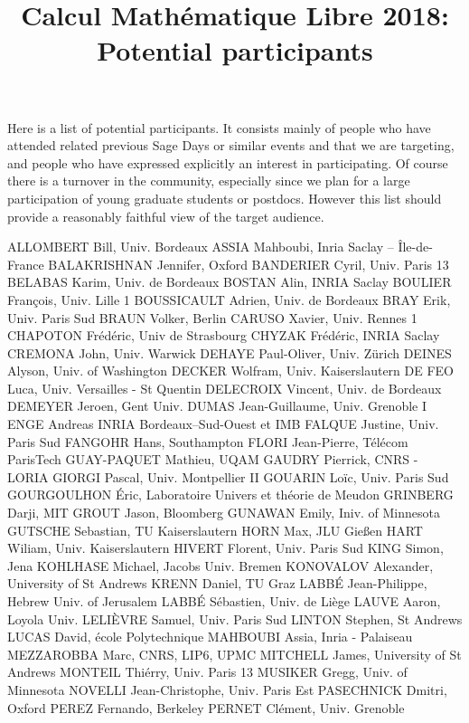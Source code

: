 \documentclass[12pt]{amsart}
\title{Calcul Mathématique Libre 2018:\\Potential participants}
\date{}
\begin{document}
\maketitle
\thispagestyle{empty}

Here is a list of potential participants. It consists mainly of people
who have attended related previous Sage Days or similar events and
that we are targeting, and people who have expressed explicitly an
interest in participating. Of course there is a turnover in the
community, especially since we plan for a large participation of young
graduate students or postdocs. However this list should provide a
reasonably faithful view of the target audience.

\bigskip

\obeylines
ALLOMBERT Bill, Univ. Bordeaux
ASSIA Mahboubi, Inria Saclay -- Île-de-France
BALAKRISHNAN Jennifer, Oxford
BANDERIER Cyril, Univ. Paris 13
BELABAS Karim, Univ. de Bordeaux
BOSTAN Alin, INRIA Saclay
BOULIER François, Univ. Lille 1
BOUSSICAULT Adrien, Univ. de Bordeaux
BRAY Erik, Univ. Paris Sud
BRAUN Volker, Berlin
CARUSO Xavier, Univ. Rennes 1
CHAPOTON Frédéric, Univ de Strasbourg
CHYZAK Frédéric, INRIA Saclay
CREMONA John, Univ. Warwick
DEHAYE Paul-Oliver, Univ. Zürich
DEINES Alyson, Univ. of Washington
DECKER Wolfram, Univ. Kaiserslautern
DE FEO Luca, Univ. Versailles - St Quentin
DELECROIX Vincent, Univ. de Bordeaux
DEMEYER Jeroen, Gent Univ.
DUMAS Jean-Guillaume, Univ. Grenoble I
ENGE Andreas INRIA Bordeaux–Sud-Ouest et IMB
FALQUE Justine, Univ. Paris Sud
FANGOHR Hans, Southampton
FLORI Jean-Pierre, Télécom ParisTech
GUAY-PAQUET Mathieu, UQAM
GAUDRY Pierrick, CNRS - LORIA
GIORGI Pascal, Univ. Montpellier II
GOUARIN Loïc, Univ. Paris Sud
GOURGOULHON Éric, Laboratoire Univers et théorie de Meudon
GRINBERG Darji, MIT
GROUT Jason, Bloomberg
GUNAWAN Emily, Iniv. of Minnesota
GUTSCHE Sebastian, TU Kaiserslautern
HORN Max, JLU Gießen
HART Wiliam, Univ. Kaiserslautern
HIVERT Florent, Univ. Paris Sud
KING Simon, Jena
KOHLHASE Michael, Jacobs Univ. Bremen
KONOVALOV Alexander, University of St Andrews
KRENN Daniel, TU Graz
LABBÉ Jean-Philippe, Hebrew Univ. of Jerusalem
LABBÉ Sébastien, Univ. de Liège
LAUVE Aaron, Loyola Univ.
LELIÈVRE Samuel, Univ. Paris Sud
LINTON Stephen, St Andrews
LUCAS David, école Polytechnique
MAHBOUBI Assia, Inria - Palaiseau
MEZZAROBBA Marc, CNRS, LIP6, UPMC
MITCHELL James, University of St Andrews
MONTEIL Thiérry, Univ. Paris 13
MUSIKER Gregg, Univ. of Minnesota
NOVELLI Jean-Christophe, Univ. Paris Est
PASECHNICK Dmitri, Oxford
PEREZ Fernando, Berkeley
PERNET Clément, Univ. Grenoble
\end{document}
